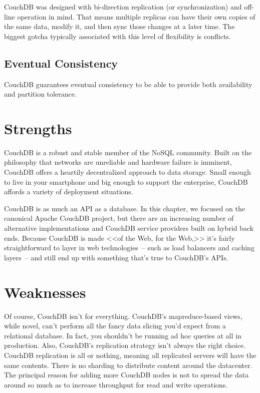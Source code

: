 CouchDB was designed with bi-direction replication (or synchronization) and off-line operation in mind. That means multiple replicas can have their own copies of the same data, modify it, and then sync those changes at a later time. The biggest gotcha typically associated with this level of flexibility is conflicts.

\subsection{Eventual Consistency}

CouchDB guarantees eventual consistency to be able to provide both availability and partition tolerance.

\section{Strengths}

CouchDB is a robust and stable member of the NoSQL community. Built on the philosophy that networks are unreliable and hardware failure is imminent, CouchDB offers a heartily decentralized approach to data storage. Small enough to live in your smartphone and big enough to support the enterprise, CouchDB affords a variety of deployment situations.

CouchDB is as much an API as a database. In this chapter, we focused on the canonical Apache CouchDB project, but there are an increasing number of alternative implementations and CouchDB service providers built on hybrid back ends. Because CouchDB is made <<of the Web, for the Web,>> it’s fairly straightforward to layer in web technologies~-- such as load balancers and caching layers~-- and still end up with something that’s true to CouchDB’s APIs.\cite{seven_databases}

\section{Weaknesses}

Of course, CouchDB isn’t for everything. CouchDB's mapreduce-based views, while novel, can't perform all the fancy data slicing you'd expect from a relational database. In fact, you shouldn’t be running ad hoc queries at all in production. Also, CouchDB's replication strategy isn't always the right choice. CouchDB replication is all or nothing, meaning all replicated servers will have the same contents. There is no sharding to distribute content around the datacenter. The principal reason for adding more CouchDB nodes is not to spread the data around so much as to increase throughput for read and write operations.\cite{seven_databases}

